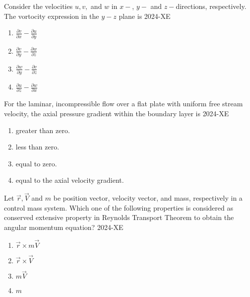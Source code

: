 	\item Consider the velocities $u,v,$ and $w$ in $x-$, $y-$ and $z-$directions, respectively. The vortocity expression in the $y-z$ plane is
	\hfill{2024-XE}

		\begin{enumerate}
			\item $\frac{\partial v}{\partial x}-\frac{\partial u}{\partial y}$
			\item $\frac{\partial v}{\partial y}-\frac{\partial w}{\partial z}$
			\item $\frac{\partial w}{\partial y}-\frac{\partial v}{\partial z}$
			\item $\frac{\partial u}{\partial z}-\frac{\partial w}{\partial x}$
		\end{enumerate}

	\item For the laminar, incompressible flow over a flat plate with uniform free stream velocity, the axial pressure gradient within the boundary layer is
	\hfill{2024-XE}

		\begin{enumerate}
			\item greater than zero.
			\item less than zero.
			\item equal to zero.
			\item equal to the axial velocity gradient.
		\end{enumerate}

	\item Let $\vec{r}, \vec{V}$ and $m$ be position vector, velocity vector, and mass, respectively in a control mass system. Which one of the following properties is considered as conserved extensive property in Reynolds Transport Theorem to obtain the angular momentum equation?
	\hfill{2024-XE}

		\begin{enumerate}
			\item $\vec{r} \times m\vec{V}$
			\item $\vec{r} \times \vec{V}$
			\item $m\vec{V}$
			\item $m$
		\end{enumerate}

%




				




	



	




